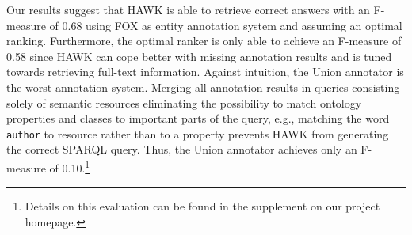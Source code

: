 Our results suggest that HAWK is able to retrieve correct answers with an F-measure of 0.68 using FOX as entity annotation system and assuming an optimal ranking.
Furthermore, the optimal ranker is only able to achieve an F-measure of 0.58 since HAWK can cope better with missing annotation results and is tuned towards retrieving full-text information.
Against intuition, the Union annotator is the worst annotation system. 
Merging all annotation results in queries consisting solely of semantic resources eliminating the possibility to match ontology properties and classes to important parts of the query, e.g., matching the word \texttt{author} to resource rather than to a property prevents HAWK from generating the correct SPARQL query.
Thus, the Union annotator achieves only an F-measure of 0.10.\footnote{Details on this evaluation can be found in the supplement on our project homepage.}


